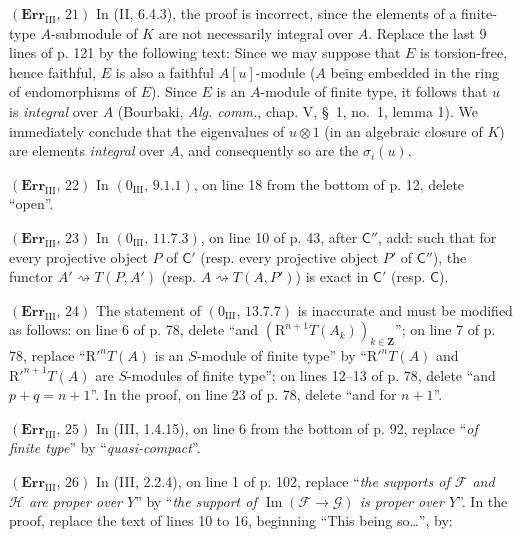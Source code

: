 \documentclass[10pt,oneside]{book}
\newcommand{\sh}[1]{\mathscr{#1}}
\newcommand{\RR}{\mathrm R}
\begin{document}
\noindent\textbf{$(\mathbf{Err}_{\mathrm{III}},\,21)$} In (II, 6.4.3), the
proof is incorrect, since the elements of a finite-type $A$-submodule of $K$
are not necessarily integral over $A$. Replace the last 9 lines of p. 121 by
the following text: Since we may suppose that $E$ is torsion-free, hence
faithful, $E$ is also a faithful $A[u]$-module ($A$ being embedded in the
ring of endomorphisms of $E$). Since $E$ is an $A$-module of finite type, it
follows that $u$ is \emph{integral} over $A$ (Bourbaki, \emph{Alg. comm.},
chap. V, \S~1, no.~1, lemma 1). We immediately conclude that the eigenvalues
of $u\otimes1$ (in an algebraic closure of $K$) are elements \emph{integral}
over $A$, and consequently so are the $\sigma_i(u)$.

\noindent\textbf{$(\mathbf{Err}_{\mathrm{III}},\,22)$} In
$(0_{\mathrm{III}},\,9.1.1)$, on line 18 from the bottom of p. 12, delete
``open''.

\noindent\textbf{$(\mathbf{Err}_{\mathrm{III}},\,23)$} In
$(0_{\mathrm{III}},\,11.7.3)$, on line 10 of p. 43, after $\mathsf C''$, add:
such that for every projective object $P$ of $\mathsf C'$ (resp. every
projective object $P'$ of $\mathsf C''$), the functor
$A'\rightsquigarrow T(P,A')$ (resp. $A\rightsquigarrow T(A,P')$) is exact in
$\mathsf C'$ (resp. $\mathsf C$).

\noindent\textbf{$(\mathbf{Err}_{\mathrm{III}},\,24)$} The statement of
$(0_{\mathrm{III}},\,13.7.7)$ is inaccurate and must be modified as follows:
on line 6 of p. 78, delete ``and
$(\RR^{n+1}T(A_k))_{k\in\mathbf Z}$''; on line 7 of p. 78, replace
``$\RR'^nT(A)$ is an $S$-module of finite type'' by ``$\RR'^nT(A)$ and
$\RR'^{n+1}T(A)$ are $S$-modules of finite type''; on lines 12--13 of p. 78,
delete ``and $p+q=n+1$''. In the proof, on line 23 of p. 78, delete ``and for
$n+1$''.

\noindent\textbf{$(\mathbf{Err}_{\mathrm{III}},\,25)$} In (III, 1.4.15), on
line 6 from the bottom of p. 92, replace ``\emph{of finite type}'' by
``\emph{quasi-compact}''.

\noindent\textbf{$(\mathbf{Err}_{\mathrm{III}},\,26)$} In (III, 2.2.4), on
line 1 of p. 102, replace ``\emph{the supports of $\sh{F}$ and $\sh{H}$ are
proper over $Y$}'' by ``\emph{the support of
$\operatorname{Im}(\sh{F}\to\sh{G})$ is proper over $Y$}''. In the proof,
replace the text of lines 10 to 16, beginning ``This being so\ldots{}'', by:
\end{document}
